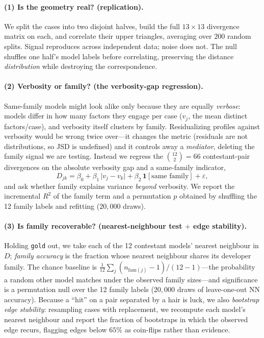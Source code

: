 \documentclass{article}
\begin{document}
\paragraph{(1) Is the geometry real? (replication).} We split the cases into two disjoint halves,
build the full $13\times13$ divergence matrix on each, and correlate their upper triangles,
averaging over $200$ random splits. Signal reproduces across independent data; noise does not.
The null shuffles one half's model labels before correlating, preserving the distance
\emph{distribution} while destroying the correspondence.

\paragraph{(2) Verbosity or family? (the verbosity-gap regression).} Same-family models might
look alike only because they are equally \emph{verbose}: models differ in how many factors they
engage per case ($v_j$, the mean distinct factors/case), and verbosity itself clusters by
family. Residualizing profiles against verbosity would be wrong twice over---it changes the
metric (residuals are not distributions, so JSD is undefined) and it controls away a
\emph{mediator}, deleting the family signal we are testing. Instead we regress the
$\binom{12}{2}{=}66$ contestant-pair divergences on the absolute verbosity gap and a same-family
indicator,
\[
 D_{jk}=\beta_0+\beta_1\,\lvert v_j-v_k\rvert+\beta_2\,\mathbf{1}[\text{same family}]+\varepsilon,
\]
and ask whether family explains variance \emph{beyond} verbosity. We report the incremental
$R^2$ of the family term and a permutation $p$ obtained by shuffling the 12 family labels and
refitting ($20{,}000$ draws).

\paragraph{(3) Is family recoverable? (nearest-neighbour test $+$ edge stability).} Holding
\texttt{gold} out, we take each of the 12 contestant models' nearest neighbour in $D$;
\emph{family accuracy} is the fraction whose nearest neighbour shares its developer family. The
chance baseline is $\tfrac{1}{12}\sum_j (n_{\mathrm{fam}(j)}-1)/(12-1)$---the probability a random
other model matches under the observed family sizes---and significance is a permutation null over
the 12 family labels ($20{,}000$ draws of leave-one-out NN accuracy). Because a ``hit'' on a pair
separated by a hair is luck, we also \emph{bootstrap edge stability}: resampling cases with
replacement, we recompute each model's nearest neighbour and report the fraction of bootstraps in
which the observed edge recurs, flagging edges below $65\%$ as coin-flips rather than evidence.
\end{document}
